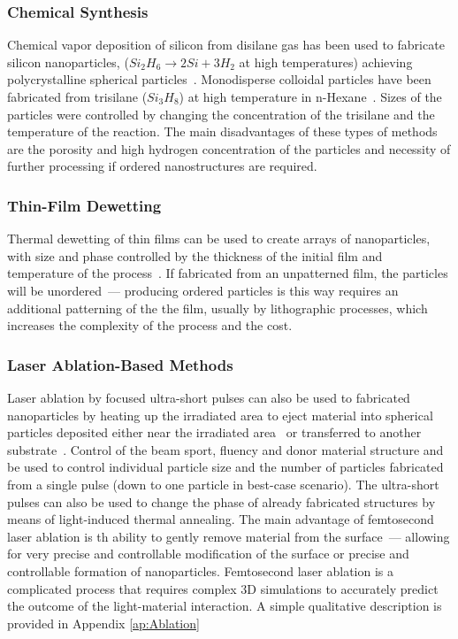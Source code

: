        \subsubsection{Chemical Synthesis}
                Chemical vapor deposition of silicon from disilane gas has been used to fabricate silicon nanoparticles, ($Si_2H_6 \rightarrow 2Si + 3H_2$ at
            high temperatures) achieving polycrystalline spherical particles~\cite{shi2012new}. Monodisperse colloidal particles have been fabricated from trisilane ($Si_3H_8$)
            at high temperature in n-Hexane~\cite{shi2013monodisperse}. Sizes of the particles were controlled by changing the concentration of the trisilane and the temperature of the
            reaction. The main disadvantages of these types of methods are the porosity and high hydrogen concentration of the particles and necessity of
            further processing if ordered nanostructures are required.

        \subsubsection{Thin-Film Dewetting}
                Thermal dewetting of thin films can be used to create arrays of nanoparticles, with size and phase controlled by the thickness of the initial
            film and temperature of the process~\cite{abbarchi2014wafer}. If fabricated from an unpatterned film, the particles will be unordered~--- producing ordered particles is this
            way requires an additional patterning of the the film, usually by lithographic processes, which increases the complexity of the process and the cost.

        \subsubsection{Laser Ablation-Based Methods}
                Laser ablation by focused ultra-short pulses can also be used to fabricated nanoparticles by heating up the irradiated area to eject material into
            spherical particles deposited either near the irradiated area~\cite{kuznetsov2012magnetic} or transferred to another substrate~\cite{zywietz2014laser}. Control of the beam sport, fluency and donor material
            structure and be used to control individual particle size and the number of particles fabricated from a single pulse (down to one particle in best-case
            scenario). The ultra-short pulses can also be used to change the phase of already fabricated structures by means of light-induced thermal annealing.
                The main advantage of femtosecond laser ablation is th ability to gently remove material from the surface~--- allowing for very precise and controllable
            modification of the surface or precise and controllable formation of nanoparticles. Femtosecond laser ablation is a complicated process that requires
            complex 3D simulations to accurately predict the outcome of the light-material interaction. A simple qualitative description is provided in Appendix \ref{ap:Ablation}


